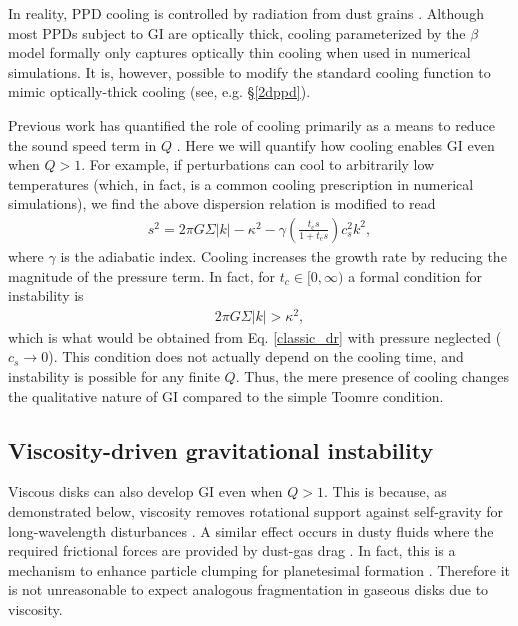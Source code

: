\documentclass[iop, numberedappendix]{emulateapj}
\newcommand{\tcool}{t_\mathrm{c}}
\begin{document}
In reality, PPD cooling is controlled by radiation   
from dust grains \citep{bell94,dalessio97,chiang97}. Although most
PPDs subject to GI are optically thick, cooling parameterized by the
$\beta$ model formally only captures optically thin cooling when
used in numerical simulations. It is, however, possible to modify the
standard cooling function to mimic optically-thick cooling (see,
e.g. \S\ref{2dppd}).  

Previous work has quantified the role of cooling primarily as a means to reduce the sound speed term
in $Q$ \citep[though see e.g.,][]{clarke07}. Here we will quantify how cooling enables GI
even when $Q>1$. For example, if perturbations can
cool to arbitrarily low temperatures (which, in fact, is a common
cooling prescription in numerical simulations), we find the above
dispersion relation is  
modified to read 
\begin{align}\label{cool_dr}
s^2 = 2\pi G\Sigma |k| - \kappa^2 - \gamma \left(\frac{\tcool s}{1 +
  \tcool s}\right)c_s^2k^2,
\end{align}
where $\gamma$ is the adiabatic index. Cooling increases the growth
rate by reducing the magnitude of the 
pressure term. In fact, for $t_c\in[0,\infty)$ a formal condition
for instability is  
\begin{align*}
  2\pi G \Sigma |k| > \kappa^2,
\end{align*}
which is what would be obtained from Eq. \ref{classic_dr} with 
pressure neglected ($c_s\to 0$). This condition does not actually
depend on the cooling time, and instability is
possible for any finite $Q$. %
Thus, the mere presence of cooling changes the qualitative nature of
GI compared to the simple Toomre condition. 
   


\subsection{Viscosity-driven gravitational instability}\label{visc_gi}
Viscous disks can also develop GI even when $Q>1$. This is because, as 
demonstrated below, viscosity removes rotational support against  
self-gravity for long-wavelength disturbances 
\citep{lynden-bell74,willerding92,gammie96}. A similar effect   
occurs in dusty fluids where the required frictional forces are 
provided by dust-gas drag {\bf \citep{goodman00,ward00, takahashi14}}. 
In fact, this
is a mechanism to enhance particle clumping for planetesimal
formation %
{\bf \citep{youdin05,youdin11}}. Therefore it is not unreasonable to expect analogous
fragmentation in gaseous disks due to viscosity.   
\end{document}
